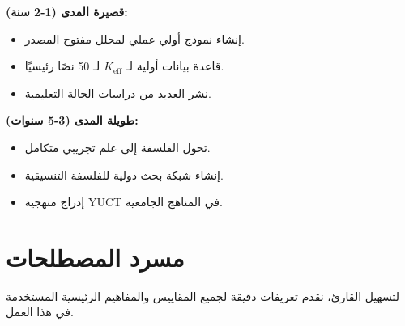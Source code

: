 \documentclass[11pt,a4paper]{article}
\begin{document}
	\textbf{قصيرة المدى (1-2 سنة):}
	\begin{itemize}
		\item إنشاء نموذج أولي عملي لمحلل مفتوح المصدر.
		\item قاعدة بيانات أولية لـ \(K_{\mathrm{eff}}\) لـ 50 نصًا رئيسيًا.
		\item نشر العديد من دراسات الحالة التعليمية.
	\end{itemize}
	
	\textbf{طويلة المدى (3-5 سنوات):}
	\begin{itemize}
		\item تحول الفلسفة إلى علم تجريبي متكامل.
		\item إنشاء شبكة بحث دولية للفلسفة التنسيقية.
		\item إدراج منهجية YUCT في المناهج الجامعية.
	\end{itemize}
	
	\section{مسرد المصطلحات}
	\label{sec:glossary}
	
	لتسهيل القارئ، نقدم تعريفات دقيقة لجميع المقاييس والمفاهيم الرئيسية المستخدمة في هذا العمل.
	
\end{document}
